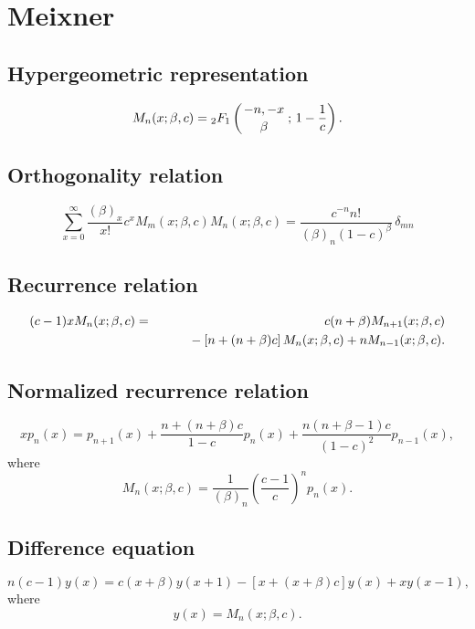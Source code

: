 \documentclass[envcountchap,graybox]{svmono}
\newcommand{\hyp}[5]{\mbox{}_{#1}{F}_{#2}
\left(\genfrac{}{}{0pt}{}{#3}{#4}\,;\,#5\right)}
\newcommand{\mathindent}{\hspace{7.5mm}}
\newcommand{\hyp}[5]{\,\mbox{}_{#1}F_{#2}\!\left(
  \genfrac{}{}{0pt}{}{#3}{#4};#5\right)}
\begin{document}
\section{Meixner}

\par\setcounter{equation}{0}

\subsection*{Hypergeometric representation}
\begin{equation}
\label{DefMeixner}
M_n(x;\beta,c)=\hyp{2}{1}{-n,-x}{\beta}{1-\frac{1}{c}}.
\end{equation}

\subsection*{Orthogonality relation}
\begin{equation}
\label{OrtMeixner}
\sum_{x=0}^{\infty}\frac{(\beta)_x}{x!}c^xM_m(x;\beta,c)M_n(x;\beta,c)
{}=\frac{c^{-n}n!}{(\beta)_n(1-c)^{\beta}}\,\delta_{mn}
\end{equation}

\subsection*{Recurrence relation}
\begin{eqnarray}
\label{RecMeixner}
(c-1)xM_n(x;\beta,c)&=&c(n+\beta)M_{n+1}(x;\beta,c)\nonumber\\
& &{}\mathindent{}-\left[n+(n+\beta)c\right]M_n(x;\beta,c)+nM_{n-1}(x;\beta,c).
\end{eqnarray}

\subsection*{Normalized recurrence relation}
\begin{equation}
\label{NormRecMeixner}
xp_n(x)=p_{n+1}(x)+\frac{n+(n+\beta)c}{1-c}p_n(x)+
\frac{n(n+\beta-1)c}{(1-c)^2}p_{n-1}(x),
\end{equation}
where
$$M_n(x;\beta,c)=\frac{1}{(\beta)_n}\left(\frac{c-1}{c}\right)^np_n(x).$$

\subsection*{Difference equation}
\begin{equation}
\label{dvMeixner}
n(c-1)y(x)=c(x+\beta)y(x+1)-\left[x+(x+\beta)c\right]y(x)+xy(x-1),
\end{equation}
where
$$y(x)=M_n(x;\beta,c).$$
\end{document}
